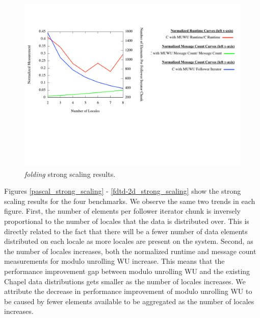 \begin{figure}
\begin{center}
\includegraphics[width=\linewidth]{./Figures/strong_scaling/folding.pdf}
\caption{\textit{folding} strong scaling results.}
\label{folding_strong_scaling}
\end{center}
\end{figure}

Figures \ref{pascal_strong_scaling} - \ref{fdtd-2d_strong_scaling} show the strong scaling results for the four benchmarks. We observe the same two trends in each figure. First, the number of elements per follower iterator chunk is inversely proportional to the number of locales that the data is distributed over. This is directly related to the fact that there will be a fewer number of data elements distributed on each locale as more locales are present on the system. Second, as the number of locales increases, both the normalized runtime and message count measurements for modulo unrolling WU increase. This means that the performance improvement gap between modulo unrolling WU and the existing Chapel data distributions gets smaller as the number of locales increases. We attribute the decrease in performance improvement of modulo unrolling WU to be caused by fewer elements available to be aggregated as the number of locales increases.  


